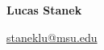 

%

\noindent  \LARGE{\textbf{Lucas Stanek}} %

\normalsize
\noindent \href{mailto:staneklu@msu.edu}{staneklu@msu.edu}

\noindent\hrulefill
\vspace{1em}

